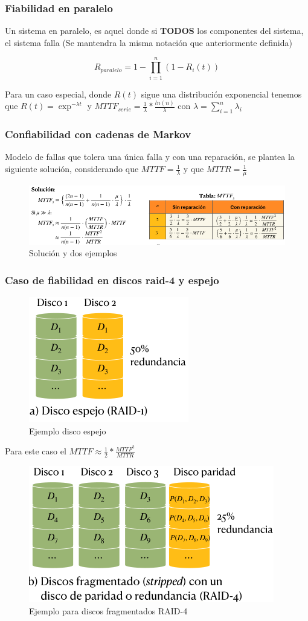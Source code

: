 \subsubsection{Fiabilidad en paralelo}
Un sistema en paralelo, es aquel donde si \textbf{TODOS} los componentes del sistema, el sistema falla (Se mantendra la misma notación que anteriormente definida)

\[
    R_{paralelo}= 1 - \prod_{i=1}^{n} (1-R_i(t))
\]

Para un caso especial, donde $R(t)$ sigue una distribución exponencial tenemos que $R(t)=\exp^{-\lambda t}$ y $MTTF_{serie}= \frac{1}{\lambda}*\frac{ln(n)}{\lambda}$ con $\lambda= \sum_{i=1}^{n}\lambda_i $

\subsubsection{Confiabilidad con cadenas de Markov}
Modelo de fallas que tolera una única falla y con una reparación, se plantea la siguiente solución, considerando que $MTTF=\frac{1}{\lambda}$ y que $MTTR=\frac{1}{\mu}$
\begin{figure}[H]
    \centering
    \includegraphics[width=0.6\linewidth]{img/Markov.png}
    \caption{Solución y dos ejemplos}\label{fig:1761834118505}
\end{figure}

\subsubsection{Caso de fiabilidad en discos raid-4 y espejo}

\begin{figure}[H]
    \centering
    \includegraphics[width=0.2\linewidth]{img/Espejo.png}
    \caption{Ejemplo disco espejo}\label{fig:1761834250462}
\end{figure}
Para este caso el $MTTF\approx\frac{1}{2}*\frac{MTTF^2}{MTTR}$


\begin{figure}[H]
    \centering
    \includegraphics[width=0.2\linewidth]{img/Raid-4.png}
    \caption{Ejemplo para discos fragmentados RAID-4}\label{fig:1761834325234}
\end{figure}

